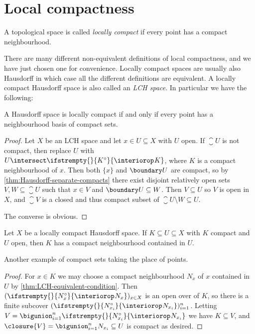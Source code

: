 \documentclass[article, a4paper, 11pt, oneside]{memoir}
\numberwithin{equation}{chapter}
\renewcommand\interior[2][]{%
    \ifstrempty{#1}{%
        #2^{\circ}
    }{%
        \interiorop_{#1}#2
    }%
}
\begin{document}
\section{Local compactness}

\begin{definition}
    A topological space is called \emph{locally compact} if every point has a compact neighbourhood.
\end{definition}
%
There are many different non-equivalent definitions of local compactness, and we have just chosen one for convenience. Locally compact spaces are usually also Hausdorff in which case all the different definitions are equivalent. A locally compact Hausdorff space is also called an \emph{LCH space}. In particular we have the following:

\begin{proposition}
    \label{thm:LCH-equivalent-condition}
    A Hausdorff space is locally compact if and only if every point has a neighbourhood basis of compact sets.
\end{proposition}

\begin{proof}
    Let $X$ be an LCH space and let $x \in U \subseteq X$ with $U$ open. If $\closure{U}$ is not compact, then replace $U$ with $U \intersect \interior{K}$, where $K$ is a compact neighbourhood of $x$. Then both $\{x\}$ and $\boundary U$ are compact, so by \cref{thm:Hausdorff-separate-compacts} there exist disjoint relatively open sets $V, W \subseteq \closure{U}$ such that $x \in V$ and $\boundary U \subseteq W$. Then $V \subseteq U$ so $V$ is open in $X$, and $\closure{V}$ is a closed and thus compact subset of $\closure{U} \setminus W \subseteq U$.

    The converse is obvious.
\end{proof}


\begin{corollary}
    \label{thm:LCH-compact-set-has-compact-nhood}
    Let $X$ be a locally compact Hausdorff space. If $K \subseteq U \subseteq X$ with $K$ compact and $U$ open, then $K$ has a compact neighbourhood contained in $U$.
\end{corollary}
%
Another example of compact sets taking the place of points.

\begin{proof}
    For $x \in K$ we may choose a compact neighbourhood $N_x$ of $x$ contained in $U$ by \cref{thm:LCH-equivalent-condition}. Then $(\interior{N_x})_{x \in X}$ is an open over of $K$, so there is a finite subcover $(\interior{N_{x_i}})_{i=1}^n$. Letting $V = \bigunion_{i=1}^n \interior{N_{x_i}}$ we have $K \subseteq V$, and $\closure{V} = \bigunion_{i=1}^n N_{x_i} \subseteq U$ is compact as desired.
\end{proof}
\end{document}
